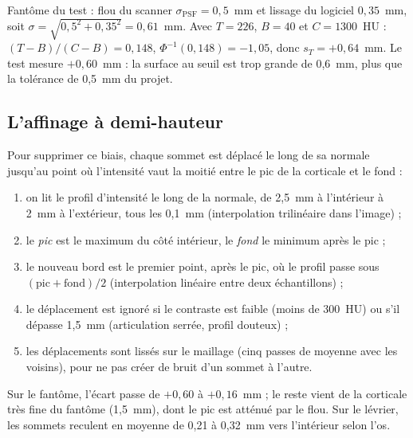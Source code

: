 
\begin{exemple}
Fantôme du test  : flou du scanner $\sigma_{\text{PSF}} = 0{,}5$~mm et lissage du logiciel
$0{,}35$~mm, soit $\sigma = \sqrt{0{,}5^2 + 0{,}35^2} = 0{,}61$~mm. Avec $T = 226$, $B = 40$ et $C = 1300$~HU :
$(T - B)/(C - B) = 0{,}148$, $\Phi^{-1}(0{,}148) = -1{,}05$, donc $s_T = +0{,}64$~mm. Le test mesure $+0{,}60$~mm : la
surface au seuil est trop grande de 0,6~mm, plus que la tolérance de 0,5~mm du projet.
\end{exemple}

\subsection{L'affinage à demi-hauteur}

Pour supprimer ce biais, chaque sommet est déplacé le long de sa normale jusqu'au point où l'intensité vaut la moitié
entre le pic de la corticale et le fond :
\begin{enumerate}
  \item on lit le profil d'intensité le long de la normale, de 2,5~mm à l'intérieur à 2~mm à l'extérieur, tous les
  0,1~mm (interpolation trilinéaire dans l'image) ;
  \item le \emph{pic} est le maximum du côté intérieur, le \emph{fond} le minimum après le pic ;
  \item le nouveau bord est le premier point, après le pic, où le profil passe sous $(\text{pic} + \text{fond})/2$
  (interpolation linéaire entre deux échantillons) ;
  \item le déplacement est ignoré si le contraste est faible (moins de 300~HU) ou s'il dépasse 1,5~mm (articulation
  serrée, profil douteux) ;
  \item les déplacements sont lissés sur le maillage (cinq passes de moyenne avec les voisins), pour ne pas créer de
  bruit d'un sommet à l'autre.
\end{enumerate}

\begin{exemple}
Sur le fantôme, l'écart passe de $+0{,}60$ à $+0{,}16$~mm ; le reste vient de la corticale très fine du fantôme
(1,5~mm), dont le pic est atténué par le flou. Sur le lévrier, les sommets reculent en moyenne de 0,21 à 0,32~mm
vers l'intérieur selon l'os.
\end{exemple}

